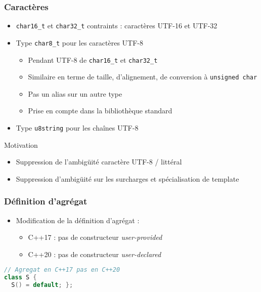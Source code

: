 \documentclass[C++.tex]{subfiles}
\begin{document}
\begin{frame}[fragile]
	\frametitle{Caractères}
	\begin{itemize}
		\item \lstinline|char16_t| et \lstinline|char32_t| contraints : caractères UTF-16 et UTF-32


		\item Type \lstinline|char8_t| pour les caractères UTF-8
		\begin{itemize}
			\item Pendant UTF-8 de \lstinline|char16_t| et \lstinline|char32_t|
			\item Similaire en terme de taille, d'alignement, de conversion à \lstinline|unsigned char|
			\item Pas un alias sur un autre type
			\item Prise en compte dans la bibliothèque standard
		\end{itemize}
		\item Type \lstinline|u8string| pour les chaînes UTF-8
	\end{itemize}

	\begin{block}{Motivation}
		\begin{itemize}
			\item Suppression de l'ambigüité caractère UTF-8 / littéral


			\item Suppression d'ambigüité sur les surcharges et spécialisation de template
		\end{itemize}
	\end{block}
\end{frame}

\begin{frame}[fragile]
	\frametitle{Définition d'agrégat}
	\begin{itemize}
		\item Modification de la définition d'agrégat :
		\begin{itemize}
			\item C++17 : pas de constructeur \textit{user-provided}
			\item C++20 : pas de constructeur \textit{user-declared}

		\end{itemize}
	\end{itemize}
	
	\begin{lstlisting}[language=C++]
// Agregat en C++17 pas en C++20
class S {
  S() = default; };\end{lstlisting}
\end{frame}
\end{document}
